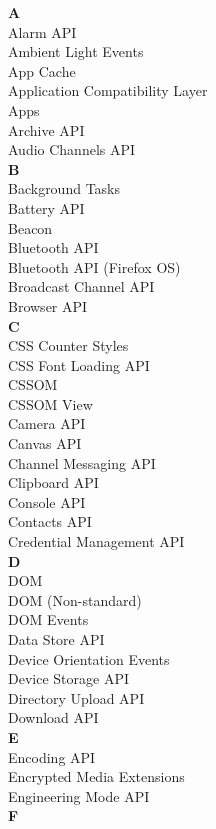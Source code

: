  \hypertarget{app-a}{\label{app-a}}


\begin{multicols}{4}
\textbf{A}
\\ Alarm API
\\ Ambient Light Events
\\ App Cache
\\ Application Compatibility Layer
\\ Apps
\\ Archive API
\\ Audio Channels API
\\ \textbf{B}
\\ Background Tasks
\\ Battery API
\\ Beacon
\\ Bluetooth API
\\ Bluetooth API (Firefox OS)
\\ Broadcast Channel API
\\ Browser API
\\ \textbf{C}
\\ CSS Counter Styles
\\ CSS Font Loading API 
\\ CSSOM
\\ CSSOM View
\\ Camera API
\\ Canvas API
\\ Channel Messaging API
\\ Clipboard API
\\ Console API
\\ Contacts API
\\ Credential Management API
\\ \textbf{D}
\\ DOM
\\ DOM (Non-standard)
\\ DOM Events
\\ Data Store API
\\ Device Orientation Events
\\ Device Storage API
\\ Directory Upload API
\\ Download API
\\ \textbf{E}
\\ Encoding API
\\ Encrypted Media Extensions
\\ Engineering Mode API
\\ \textbf{F}

\end{multicols}
